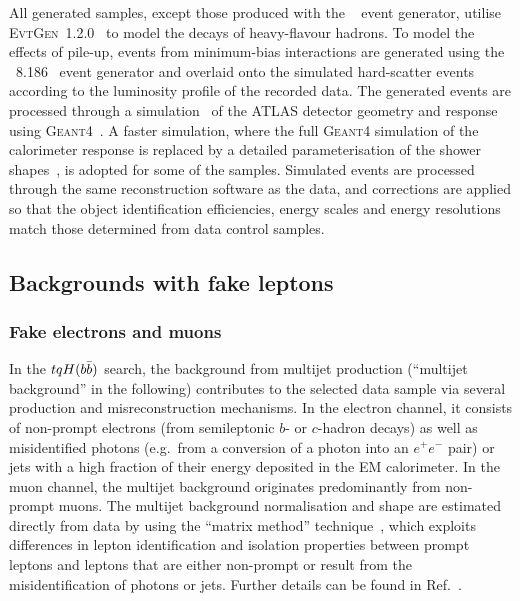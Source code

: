 All generated samples, except those produced with the {\sherpa}~\cite{Gleisberg:2008ta} event generator, 
utilise \textsc{EvtGen}~1.2.0~\cite{Lange:2001uf} to model the decays of heavy-flavour hadrons. 
To model the effects of pile-up, events from minimum-bias interactions are generated using the {\pythia}~8.186~\cite{Sjostrand:2007gs} 
event generator and overlaid onto the simulated hard-scatter events according to the luminosity profile of the recorded data. 
The generated events are processed through a simulation~\cite{Aad:2010ah} of the ATLAS detector geometry and response 
using \textsc{Geant4}~\cite{Agostinelli:2002hh}. A faster simulation, where the full \textsc{Geant4} simulation of
the calorimeter response is replaced by a detailed parameterisation of the shower shapes~\cite{FastCaloSim},
is adopted for some of the samples.
Simulated events are processed through the same reconstruction software as the data, and corrections are applied so that the object identification 
efficiencies, energy scales and energy resolutions match those determined from data control samples.

\subsection{Backgrounds with fake leptons}
\label{sec:fakeleptons}

\subsubsection{Fake electrons and muons}
In the $tqH(b\bar{b})$ search, the background from multijet production (``multijet background'' in the following) contributes to the selected 
data sample via several production and misreconstruction mechanisms.  
In the electron channel, it consists of non-prompt electrons (from semileptonic $b$- or $c$-hadron decays) as well as 
misidentified photons (e.g.~from a conversion of a photon into an $e^+e^-$ pair) or jets with a high fraction of 
their energy deposited in the EM calorimeter.  In the muon channel, the multijet background originates predominantly from 
non-prompt muons.  The multijet background normalisation and shape are estimated directly from data by using the ``matrix method''
technique~\cite{Aad:2010ey,ATLAS-CONF-2014-058}, which exploits differences in lepton identification and isolation properties between 
prompt leptons and leptons that are either non-prompt or result from the misidentification of photons or jets. 
Further details can be found in Ref.~\cite{Aaboud:2018mjh}.

